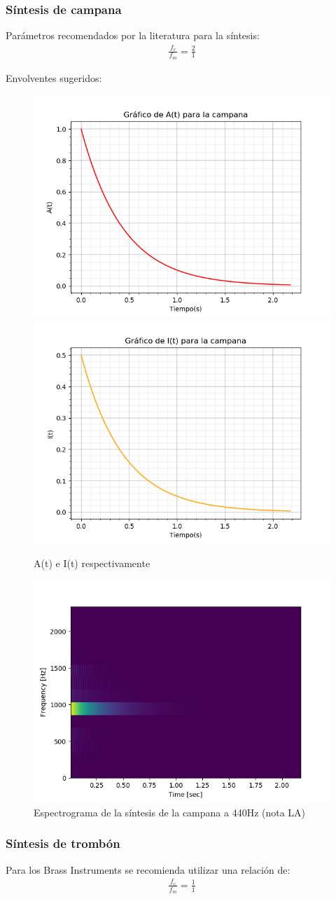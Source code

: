 \documentclass[assd_tp2_main.tex]{subfiles}
\begin{document}
\subsubsection{Síntesis de campana}
Parámetros recomendados por la literatura para la síntesis:
\begin{eqnarray*}
\displaystyle \frac{f_c}{f_m}=\frac{2}{1}
\end{eqnarray*}
\par
Envolventes sugeridos:
\begin{figure}[H]
\centering
\includegraphics[width=0.4\linewidth]{graficos/EJ4/at_bell.png}
\includegraphics[width=0.4\linewidth]{graficos/EJ4/it_bell.png}
\caption{A(t) e I(t) respectivamente}
\label{fig:bell_envelopes}
\end{figure}

\begin{figure}[H]
\centering
\includegraphics[width=0.4\linewidth]{graficos/EJ4/BellEspectogram440Hz.png}
\caption{Espectrograma de la síntesis de la campana a 440Hz (nota LA)}
\label{fig:bell_440}
\end{figure}
\subsubsection{Síntesis de trombón}
Para los Brass Instruments se recomienda utilizar una relación de:
\begin{eqnarray*}
\displaystyle \frac{f_c}{f_m}=\frac{1}{1}
\end{eqnarray*}
\end{document}
